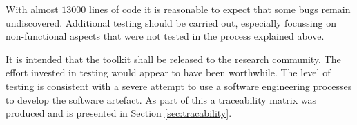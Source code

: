 With almost $13000$ lines of code it is reasonable to expect that some bugs remain undiscovered.
Additional testing should be carried out, especially focussing on non-functional aspects that were not tested in the process explained above.

It is intended that the toolkit shall be released to the research community.
The effort invested in testing would appear to have been worthwhile.
The level of testing is consistent with a severe attempt to use a software engineering processes to develop the software artefact.
As part of this a traceability matrix was produced and is presented in Section \ref{sec:tracability}.

